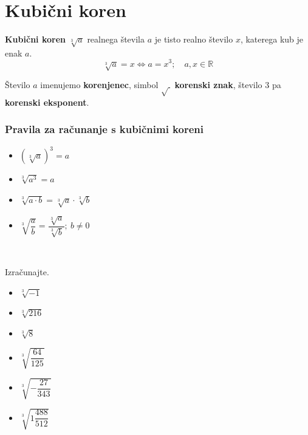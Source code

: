         \newpage
    \section{Kubični koren}

        

            
                \textbf{Kubični koren} $\sqrt[3]{a}$ realnega števila $a$ je tisto realno število $x$,
                katerega kub je enak $a$.
                $$\sqrt[3]{a}=x \Leftrightarrow a=x^3; \quad a,x\in\mathbb{R}$$

                Število $a$ imenujemo \textbf{korenjenec}, simbol $\sqrt{~}$ \textbf{korenski znak}, število $3$ pa \textbf{korenski eksponent}.
            

            \subsubsection*{Pravila za računanje s kubičnimi koreni}
                
                    \begin{itemize}
                        \item $\left(\sqrt[3]{a}\right)^3=a$
                        \item $\sqrt[3]{a^3}=a$
                        \item $\sqrt[3]{a\cdot b}=\sqrt[3]{a}\cdot\sqrt[3]{b}$
                        \item $\sqrt[3]{\dfrac{a}{b}}=\dfrac{\sqrt[3]{a}}{\sqrt[3]{b}}; ~b\neq 0$
                    \end{itemize}
                
            

                    ~~~


        
            \begin{naloga}
                Izračunajte.
                \begin{itemize}
                    
                        \item $\sqrt[3]{-1}$ 
                        \item $\sqrt[3]{216}$ 
                        \item $\sqrt[3]{8}$ 
                        \item $\sqrt[3]{\dfrac{64}{125}}$ 
                        \item $\sqrt[3]{-\dfrac{27}{343}}$ 
                        \item $\sqrt[3]{1\dfrac{488}{512}}$ 
                    

                \end{itemize}
            \end{naloga}
        



